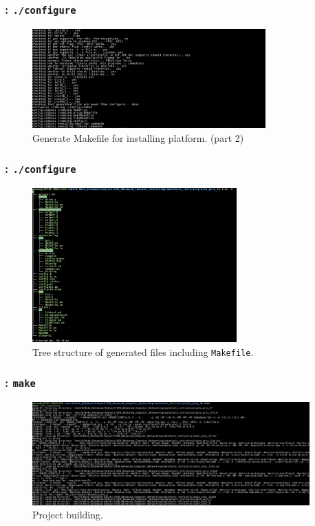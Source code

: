 \begin{frame}
    \frametitle{: \texttt{./configure}}

    \begin{figure}[H]
        \centering
        \includegraphics[width=0.8\textwidth]{../figure/autotool_4.png}
        \caption*{Generate Makefile for installing platform. (part 2)}
    \end{figure}
\end{frame}

\begin{frame}
    \frametitle{: \texttt{./configure}}

    \begin{figure}[H]
        \centering
        \includegraphics[width=0.7\textwidth]{../figure/autotool_5.png}
        \caption*{Tree structure of generated files including \texttt{Makefile}.}
    \end{figure}
\end{frame}

\begin{frame}
    \frametitle{: \texttt{make}}

    \begin{figure}[H]
        \centering
        \includegraphics[width=0.95\textwidth]{../figure/autotool_6.png}
        \caption*{Project building.}
    \end{figure}
\end{frame}

